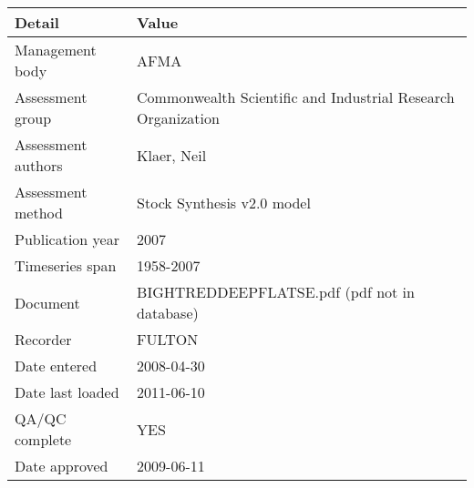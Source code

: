 \begin{table}[htb]
\centering
\begin{tabular}{lp{7cm}}
\toprule
Detail & Value \\
\midrule
Management body    & AFMA                                                         \\
Assessment group   & Commonwealth Scientific and Industrial Research Organization \\
Assessment authors & Klaer, Neil                                                  \\
Assessment method  & Stock Synthesis v2.0 model                                   \\
Publication year   & 2007                                                         \\
Timeseries span    & 1958-2007                                                    \\
Document           & BIGHTREDDEEPFLATSE.pdf (pdf not in database)                 \\
Recorder           & FULTON                                                       \\
Date entered       & 2008-04-30                                                   \\
Date last loaded   & 2011-06-10                                                   \\
QA/QC complete     & YES                                                          \\
Date approved      & 2009-06-11                                                   \\
\bottomrule
\end{tabular}
\label{tab:assessdet}
\end{table}
